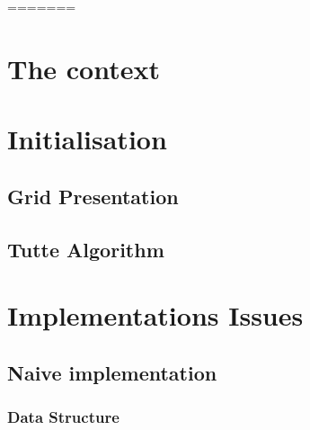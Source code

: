 \documentclass[12pt]{report}
\begin{document}






\begin{abstract}

\end{abstract}

\tableofcontents
\listoffigures






=======
\chapter{The context}

%

\chapter{Initialisation}

\section{Grid Presentation}

\section{Tutte Algorithm}





\chapter{Implementations Issues}

\section{Naive implementation}

\subsection{Data Structure}
\end{document}
